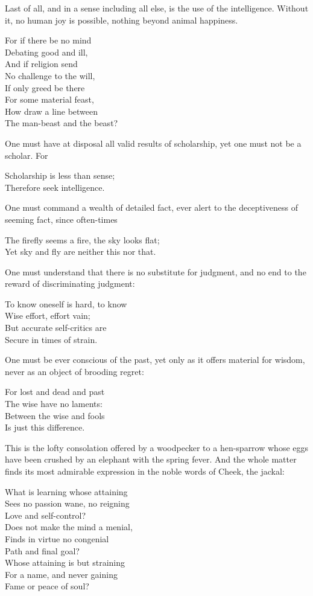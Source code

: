 Last of all, and in a sense including all else, is the use of the
intelligence. Without it, no human joy is possible, nothing beyond
animal happiness.

\begin{pverse}
For if there be no mind\\
Debating good and ill,\\
And if religion send\\
No challenge to the will,\\
If only greed be there\\
For some material feast,\\
How draw a line between\\
The man-beast and the beast?
\end{pverse}
One must have at disposal all valid results of scholarship, yet one must not be a scholar. For
\begin{pverse}
Scholarship is less than sense;\\
Therefore seek intelligence.
\end{pverse}
One must command a wealth of detailed fact, ever alert to the
deceptiveness of seeming fact, since often-times
\begin{pverse}
The firefly seems a fire, the sky looks flat;\\
Yet sky and fly are neither this nor that.
\end{pverse}
One must understand that there is no substitute for judgment, and no
end to the reward of discriminating judgment:
\begin{pverse}
To know oneself is hard, to know\\
Wise effort, effort vain;\\
But accurate self-critics are\\
Secure in times of strain.
\end{pverse}
One must be ever conscious of the past, yet only as it offers material
for wisdom, never as an object of brooding regret:
\begin{pverse}
For lost and dead and past\\
The wise have no laments:\\
Between the wise and fools\\
Is just this difference.
\end{pverse}

This is the lofty consolation offered by a woodpecker to a hen-sparrow
whose eggs have been crushed by an elephant with the spring fever. And
the whole matter finds its most admirable expression in the noble
words of Cheek, the jackal:
\begin{pverse}
What is learning whose attaining\\
Sees no passion wane, no reigning\\
Love and self-control?\\
Does not make the mind a menial,\\
Finds in virtue no congenial\\
Path and final goal?\\
Whose attaining is but straining\\
For a name, and never gaining\\
Fame or peace of soul?
\end{pverse}


